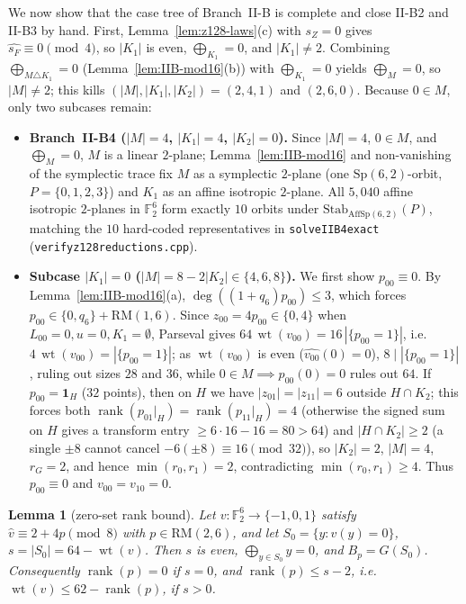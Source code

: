 \documentclass[11pt]{article}
\newtheorem{lemma}[theorem]{Lemma}
\theoremstyle{definition}
\theoremstyle{remark}
\newcommand{\F}{\mathbb{F}}
\newcommand{\wt}{\operatorname{wt}}
\newcommand{\rank}{\operatorname{rank}}
\newcommand{\ind}{\mathbf{1}}
\newcommand{\RM}{\mathrm{RM}}
\newcommand{\code}[1]{\texttt{#1}}
\DeclareRobustCommand{\_}{\textunderscore\allowbreak}
\begin{document}
We now show that the case tree of Branch~II-B is complete and close II-B2 and II-B3 by hand. First, Lemma~\ref{lem:z128-laws}(c) with $s_Z=0$ gives $\widehat{s_F}\equiv0\pmod 4$, so $|K_1|$ is even, $\bigoplus_{K_1}=0$, and $|K_1|\neq2$. Combining $\bigoplus_{M\triangle K_1}=0$ (Lemma~\ref{lem:IIB-mod16}(b)) with $\bigoplus_{K_1}=0$ yields $\bigoplus_M=0$, so $|M|\neq2$; this kills $(|M|,|K_1|,|K_2|)=(2,4,1)$ and $(2,6,0)$. Because $0\in M$, only two subcases remain:

\begin{itemize}[nosep]
\item \textbf{Branch~II-B4 ($|M|=4$, $|K_1|=4$, $|K_2|=0$).} Since $|M|=4$, $0\in M$, and $\bigoplus_M=0$, $M$ is a linear $2$-plane; Lemma~\ref{lem:IIB-mod16} and non-vanishing of the symplectic trace fix $M$ as a symplectic $2$-plane (one $\mathrm{Sp}(6,2)$-orbit, $P=\{0,1,2,3\}$) and $K_1$ as an affine isotropic $2$-plane. All $5{,}040$ affine isotropic $2$-planes in $\F_2^6$ form exactly $10$ orbits under $\mathrm{Stab}_{\mathrm{AffSp}(6,2)}(P)$, matching the $10$ hard-coded representatives in \code{solve\_IIB4\_exact} (\code{verify\_z128\_reductions.cpp}).

\item \textbf{Subcase $|K_1|=0$ ($|M|=8-2|K_2|\in\{4,6,8\}$).} We first show $p_{00}\equiv0$. By Lemma~\ref{lem:IIB-mod16}(a), $\deg((1+q_6)p_{00})\le3$, which forces $p_{00}\in\{0,q_6\}+\RM(1,6)$. Since $z_{00}=4p_{00}\in\{0,4\}$ when $L_{00}=0,u=0,K_1=\emptyset$, Parseval gives $64\,\wt(v_{00})=16\,|\{p_{00}=1\}|$, i.e.\ $4\,\wt(v_{00})=|\{p_{00}=1\}|$; as $\wt(v_{00})$ is even ($\widehat{v_{00}}(0)=0$), $8\mid|\{p_{00}=1\}|$, ruling out sizes $28$ and $36$, while $0\in M\implies p_{00}(0)=0$ rules out $64$. If $p_{00}=\ind_H$ ($32$ points), then on $H$ we have $|z_{01}|=|z_{11}|=6$ outside $H\cap K_2$; this forces both $\rank(p_{01}|_H)=\rank(p_{11}|_H)=4$ (otherwise the signed sum on $H$ gives a transform entry $\ge6\cdot16-16=80>64$) and $|H\cap K_2|\ge2$ (a single $\pm8$ cannot cancel $-6(\pm8)\equiv16\pmod{32}$), so $|K_2|=2$, $|M|=4$, $r_G=2$, and hence $\min(r_0,r_1)=2$, contradicting $\min(r_0,r_1)\ge4$. Thus $p_{00}\equiv0$ and $v_{00}=v_{10}=0$.
\end{itemize}

\begin{lemma}[zero-set rank bound]\label{lem:zsr}
Let $v:\F_2^6\to\{-1,0,1\}$ satisfy $\widehat v\equiv2+4p\pmod 8$ with $p\in\RM(2,6)$, and let $S_0=\{y:v(y)=0\}$, $s=|S_0|=64-\wt(v)$. Then $s$ is even, $\bigoplus_{y\in S_0}y=0$, and $B_p=G(S_0)$. Consequently $\rank(p)=0$ if $s=0$, and $\rank(p)\le s-2$, i.e.\ $\wt(v)\le62-\rank(p)$, if $s>0$.
\end{lemma}
\end{document}
